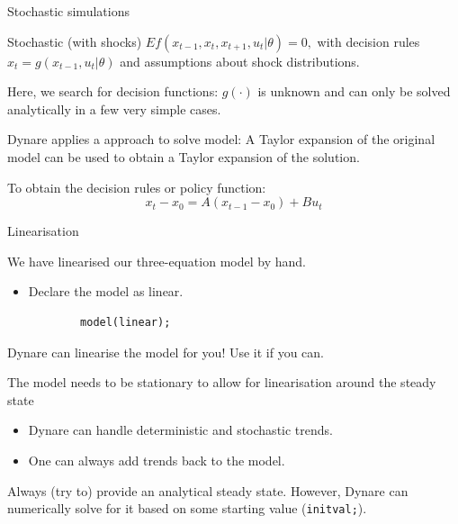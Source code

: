 \begin{frame}{Stochastic simulations}
    \begin{wideitemize}
    \item Stochastic (with shocks) $Ef\left(x_{t-1},x_t,x_{t+1},u_t | \theta \right) =0,$ with decision rules $x_t = g(x_{t-1},u_t|\theta)$ and assumptions about shock distributions.
    \item Here, we search for decision functions: $g\left(\cdot\right)$ is unknown and can only be solved analytically in a few very simple cases.
    \item Dynare applies a  approach to solve model: A Taylor expansion of the original model can be used to obtain a Taylor expansion of the solution.
    \item To obtain the decision rules or policy function:
    \begin{equation*}
        x_t - x_0 = A\left(x_{t-1}-x_0\right)+Bu_t
    \end{equation*}
    \end{wideitemize}
\end{frame}

\begin{frame}[fragile]{Linearisation}
    \begin{wideitemize}
    \item We have linearised our three-equation model by hand.
    \begin{itemize}
        \item Declare the model as linear.
        \begin{verbatim}
        model(linear);
        \end{verbatim}
    \end{itemize}
    \item Dynare can linearise the model for you! Use it if you can.
    \item The model needs to be stationary to allow for linearisation around the steady state
     \begin{itemize}
        \item Dynare can handle deterministic and stochastic trends.
        \item One can always add trends back to the model.
    \end{itemize}
    \item Always (try to) provide an analytical steady state. However, Dynare can numerically solve for it based on some starting value (\texttt{initval;}).
    \end{wideitemize}
\end{frame}


